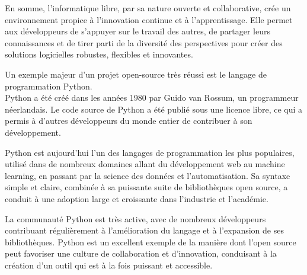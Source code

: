 En somme, l'informatique libre, par sa nature ouverte et collaborative, crée un environnement propice à l'innovation continue et à l'apprentissage. Elle permet aux développeurs de s'appuyer sur le travail des autres, de partager leurs connaissances et de tirer parti de la diversité des perspectives pour créer des solutions logicielles robustes, flexibles et innovantes.

Un exemple majeur d'un projet open-source très réussi est le langage de programmation Python.\\
Python a été créé dans les années 1980 par Guido van Rossum, un programmeur néerlandais. Le code source de Python a été publié sous une licence libre, ce qui a permis à d'autres développeurs du monde entier de contribuer à son développement.

Python est aujourd'hui l'un des langages de programmation les plus populaires, utilisé dans de nombreux domaines allant du développement web au machine learning, en passant par la science des données et l'automatisation. Sa syntaxe simple et claire, combinée à sa puissante suite de bibliothèques open source, a conduit à une adoption large et croissante dans l'industrie et l'académie.

La communauté Python est très active, avec de nombreux développeurs contribuant régulièrement à l'amélioration du langage et à l'expansion de ses bibliothèques. Python est un excellent exemple de la manière dont l'open source peut favoriser une culture de collaboration et d'innovation, conduisant à la création d'un outil qui est à la fois puissant et accessible.



